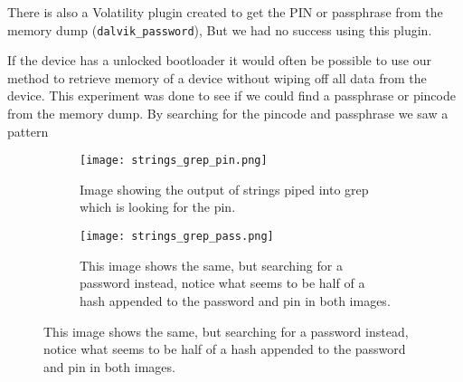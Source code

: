 There is also a Volatility plugin created to get the PIN or passphrase from the
memory dump (\texttt{dalvik\_password}),  %
But we had no success using this plugin.

If the device has a unlocked bootloader it would often be possible to use our 
method to retrieve memory of a device without wiping off all data from the 
device. This experiment was done to see if we could find a passphrase or 
pincode from the memory dump. By searching for the pincode and passphrase we saw a pattern \\


\begin{figure}
        
        \begin{subfigure}[b]{0.3\textwidth}
                \texttt{[image: strings\_grep\_pin.png]}
                \caption{Image showing the output of strings piped into grep
                which is looking for the pin.}
                \label{fig:gull}
        \end{subfigure}%
        \qquad \qquad \qquad \qquad \qquad %
        \begin{subfigure}[b]{0.3\textwidth}
                \texttt{[image: strings\_grep\_pass.png]}
                \caption{This image shows the same, but searching for a
                password instead, notice what seems to be half of a hash appended
            to the password and pin in both images.}
                \label{fig:tiger}
        \end{subfigure}
        \vspace{-20pt}

\end{figure}

